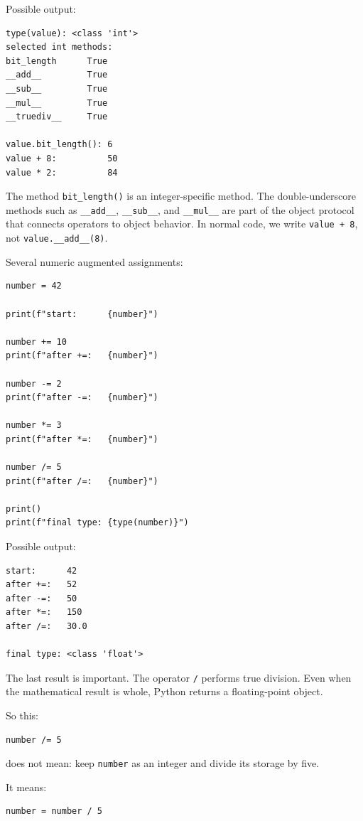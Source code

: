 Possible output:

\begin{verbatim}
type(value): <class 'int'>
selected int methods:
bit_length      True
__add__         True
__sub__         True
__mul__         True
__truediv__     True

value.bit_length(): 6
value + 8:          50
value * 2:          84
\end{verbatim}

The method \texttt{bit\_length()} is an integer-specific method. The double-underscore methods such as \texttt{\_\_add\_\_}, \texttt{\_\_sub\_\_}, and \texttt{\_\_mul\_\_} are part of the object protocol that connects operators to object behavior. In normal code, we write \texttt{value + 8}, not \texttt{value.\_\_add\_\_(8)}.

Several numeric augmented assignments:

\begin{verbatim}
number = 42

print(f"start:      {number}")

number += 10
print(f"after +=:   {number}")

number -= 2
print(f"after -=:   {number}")

number *= 3
print(f"after *=:   {number}")

number /= 5
print(f"after /=:   {number}")

print()
print(f"final type: {type(number)}")
\end{verbatim}

Possible output:

\begin{verbatim}
start:      42
after +=:   52
after -=:   50
after *=:   150
after /=:   30.0

final type: <class 'float'>
\end{verbatim}

The last result is important. The operator \texttt{/} performs true division. Even when the mathematical result is whole, Python returns a floating-point object.

So this:

\begin{verbatim}
number /= 5
\end{verbatim}

does not mean: keep \texttt{number} as an integer and divide its storage by five.

It means:

\begin{verbatim}
number = number / 5
\end{verbatim}

